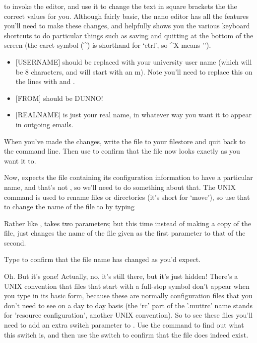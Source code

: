 to invoke the  editor, and use it to change the text in square brackets the the correct values for you. Although fairly basic, the nano editor has all the features you'll need to make these changes, and helpfully shows you the various keyboard shortcuts to do particular things such as saving and quitting at the bottom of the screen (the caret symbol (\textasciicircum) is shorthand for `ctrl', so \textasciicircum X means '').

\begin{itemize}
\item $[$USERNAME$]$ should be replaced with your university user name (which will be 8 characters, and will start with an m). Note you'll need to replace this on the lines with  and .
\item $[$FROM$]$ should be DUNNO!
\item $[$REALNAME$]$ is just your real name, in whatever way you want it to appear in outgoing emails.
\end{itemize}

When you've made the changes, write the file to your filestore and quit back to the command line. Then use  to confirm that the file now looks exactly as you want it to. 

Now,  expects the file containing its configuration information to have a particular name, and that's not , so we'll need to do something about that. The UNIX  command is used to rename files or directories (it's short for `move'), so use that to change the name of the file to  by typing


Rather like ,  takes two parameters; but this time instead of making a copy of the file,  just changes the name of the file given as the first parameter to that of the second. 

Type  to confirm that the file name has changed as you'd expect. 

Oh. But it's gone! Actually, no, it's still there, but it's just hidden! There's a UNIX convention that files that start with a full-stop symbol don't appear when you type  in its basic form, because these are normally configuration files that you don't need to see on a day to day basis (the `rc' part of the '.muttrc' name stands for 'resource configuration', another UNIX convention). So to see these files you'll need to add an extra switch parameter to . Use the  command to find out what this switch is, and then use the switch to confirm that the  file does indeed exist. 

